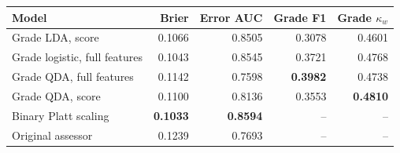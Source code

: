 \begin{tabular}{@{}lrrrr@{}}
\toprule
Model & Brier & Error AUC & Grade F1 & Grade $\kappa_w$ \\
\midrule
Grade LDA, score & 0.1066 & 0.8505 & 0.3078 & 0.4601 \\
Grade logistic, full features & 0.1043 & 0.8545 & 0.3721 & 0.4768 \\
Grade QDA, full features & 0.1142 & 0.7598 & \textbf{0.3982} & 0.4738 \\
Grade QDA, score & 0.1100 & 0.8136 & 0.3553 & \textbf{0.4810} \\
Binary Platt scaling & \textbf{0.1033} & \textbf{0.8594} & -- & -- \\
Original assessor & 0.1239 & 0.7693 & -- & -- \\
\bottomrule
\end{tabular}
